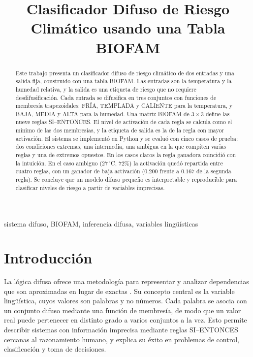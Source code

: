 \documentclass[conference]{IEEEtran}
\title{Clasificador Difuso de Riesgo Climático usando una Tabla BIOFAM}
\author{
    \IEEEauthorblockN{Melchor Alexander Araiza Zavala}
\IEEEauthorblockA{
\texttt{ma.araizazavala@ugto.mx}
}
\and
\IEEEauthorblockN{Leonardo Daniel Aviña Neri}
\IEEEauthorblockA{
\texttt{ld.avinaneri@ugto.mx}
}
\and
\IEEEauthorblockN{Ricardo Ignacio Pérez Mendoza}
\IEEEauthorblockA{
\texttt{ri.perezmendoza@ugto.mx}
}
\and
\IEEEauthorblockN{Regina Madahí Rodríguez Jasso}
\IEEEauthorblockA{
\texttt{rm.rodriguezjasso@ugto.mx}
}
\and
\IEEEauthorblockN{Emmanuel Vargas Cisneros}
\IEEEauthorblockA{
\texttt{e.vargascisneros@ugto.mx}
}
}
\begin{document}
\maketitle

\begin{abstract}
Este trabajo presenta un clasificador difuso de riesgo climático de dos entradas y una salida fija, construido con una tabla BIOFAM. Las entradas son la temperatura y la humedad relativa, y la salida es una etiqueta de riesgo que no requiere desdifusificación. Cada entrada se difusifica en tres conjuntos con funciones de membresía trapezoidales: FRÍA, TEMPLADA y CALIENTE para la temperatura, y BAJA, MEDIA y ALTA para la humedad. Una matriz BIOFAM de \(3\times3\) define las nueve reglas SI--ENTONCES. El nivel de activación de cada regla se calcula como el mínimo de las dos membresías, y la etiqueta de salida es la de la regla con mayor activación. El sistema se implementó en Python y se evaluó con cinco casos de prueba: dos condiciones extremas, una intermedia, una ambigua en la que compiten varias reglas y una de extremos opuestos. En los casos claros la regla ganadora coincidió con la intuición. En el caso ambiguo (\(27\,^\circ\)C, \(72\%\)) la activación quedó repartida entre cuatro reglas, con un ganador de baja activación (\(0.200\) frente a \(0.167\) de la segunda regla). Se concluye que un modelo difuso pequeño es interpretable y reproducible para clasificar niveles de riesgo a partir de variables imprecisas.
\end{abstract}

\begin{IEEEkeywords}
sistema difuso, BIOFAM, inferencia difusa, variables lingüísticas
\end{IEEEkeywords}

\section{Introducción}
La lógica difusa ofrece una metodología para representar y analizar dependencias que son aproximadas en lugar de exactas \cite{ross2010}. Su concepto central es la variable lingüística, cuyos valores son palabras y no números. Cada palabra se asocia con un conjunto difuso mediante una función de membresía, de modo que un valor real puede pertenecer en distinto grado a varios conjuntos a la vez. Esto permite describir sistemas con información imprecisa mediante reglas SI--ENTONCES cercanas al razonamiento humano, y explica su éxito en problemas de control, clasificación y toma de decisiones.
\end{document}
